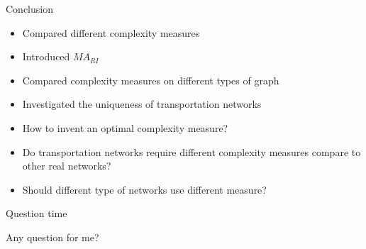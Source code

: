 \documentclass{beamer}
\begin{document}
    \begin{frame}{Conclusion}
        \begin{itemize}
            \item Compared different complexity measures
            \item Introduced $MA_{RI}$
            \item Compared complexity measures on different types of graph
            \item Investigated the uniqueness of transportation networks
            \item How to invent an optimal complexity measure?
            \item Do transportation networks require different complexity measures compare to other real networks?
            \item Should different type of networks use different measure?
        \end{itemize}
    \end{frame}

    \begin{frame}{Question time}
        \centering

        {\Huge Any question for me?}
    \end{frame}
\end{document}

